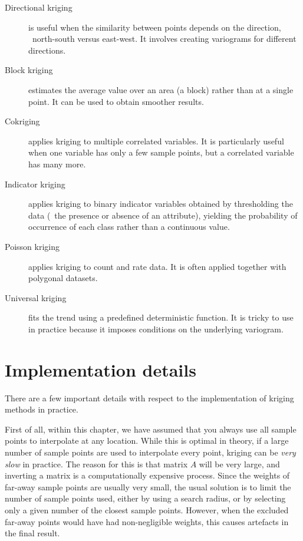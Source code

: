 \begin{description}
\item[Directional kriging] is useful when the similarity between points depends on the direction, \eg\ north-south versus east-west.
It involves creating variograms for different directions.
\item[Block kriging] estimates the average value over an area (a block) rather than at a single point.
It can be used to obtain smoother results.
\item[Cokriging] applies kriging to multiple correlated variables.
It is particularly useful when one variable has only a few sample points, but a correlated variable has many more.
\item[Indicator kriging] applies kriging to binary indicator variables obtained by thresholding the data (\eg\ the presence or absence of an attribute), yielding the probability of occurrence of each class rather than a continuous value.
\item[Poisson kriging] applies kriging to count and rate data.
It is often applied together with polygonal datasets.
\item[Universal kriging] fits the trend using a predefined deterministic function.
It is tricky to use in practice because it imposes conditions on the underlying variogram.
\end{description}

%
\section{Implementation details}%
\label{sec:kriging_impl}

There are a few important details with respect to the implementation of kriging methods in practice.

First of all, within this chapter, we have assumed that you always use all sample points to interpolate at any location.
While this is optimal in theory, if a large number of sample points are used to interpolate every point, kriging can be \emph{very slow} in practice.
The reason for this is that matrix \(A\) will be very large, and inverting a matrix is a computationally expensive process.
Since the weights of far-away sample points are usually very small, the usual solution is to limit the number of sample points used, either by using a search radius, or by selecting only a given number of the closest sample points.
However, when the excluded far-away points would have had non-negligible weights, this causes artefacts in the final result.

